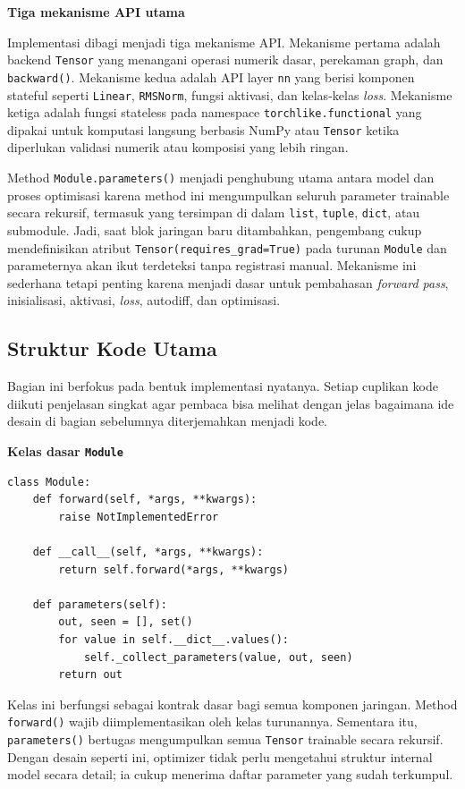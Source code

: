 \documentclass{article}
\begin{document}
\noindent\textbf{Tiga mekanisme API utama}\par
Implementasi dibagi menjadi tiga mekanisme API. Mekanisme pertama adalah backend \texttt{Tensor} yang menangani operasi numerik dasar, perekaman graph, dan \texttt{backward()}. Mekanisme kedua adalah API layer \texttt{nn} yang berisi komponen stateful seperti \texttt{Linear}, \texttt{RMSNorm}, fungsi aktivasi, dan kelas-kelas \textit{loss}. Mekanisme ketiga adalah fungsi stateless pada namespace \texttt{torchlike.functional} yang dipakai untuk komputasi langsung berbasis NumPy atau \texttt{Tensor} ketika diperlukan validasi numerik atau komposisi yang lebih ringan.

Method \texttt{Module.parameters()} menjadi penghubung utama antara model dan proses optimisasi karena method ini mengumpulkan seluruh parameter trainable secara rekursif, termasuk yang tersimpan di dalam \texttt{list}, \texttt{tuple}, \texttt{dict}, atau submodule. Jadi, saat blok jaringan baru ditambahkan, pengembang cukup mendefinisikan atribut \texttt{Tensor(requires\_grad=True)} pada turunan \texttt{Module} dan parameternya akan ikut terdeteksi tanpa registrasi manual. Mekanisme ini sederhana tetapi penting karena menjadi dasar untuk pembahasan \textit{forward pass}, inisialisasi, aktivasi, \textit{loss}, autodiff, dan optimisasi.

\subsection{Struktur Kode Utama}
Bagian ini berfokus pada bentuk implementasi nyatanya. Setiap cuplikan kode diikuti penjelasan singkat agar pembaca bisa melihat dengan jelas bagaimana ide desain di bagian sebelumnya diterjemahkan menjadi kode.

\noindent\textbf{Kelas dasar \texttt{Module}}\par
\begin{lstlisting}
class Module:
    def forward(self, *args, **kwargs):
        raise NotImplementedError

    def __call__(self, *args, **kwargs):
        return self.forward(*args, **kwargs)

    def parameters(self):
        out, seen = [], set()
        for value in self.__dict__.values():
            self._collect_parameters(value, out, seen)
        return out
\end{lstlisting}
Kelas ini berfungsi sebagai kontrak dasar bagi semua komponen jaringan. Method \texttt{forward()} wajib diimplementasikan oleh kelas turunannya. Sementara itu, \texttt{parameters()} bertugas mengumpulkan semua \texttt{Tensor} trainable secara rekursif. Dengan desain seperti ini, optimizer tidak perlu mengetahui struktur internal model secara detail; ia cukup menerima daftar parameter yang sudah terkumpul.
\end{document}
